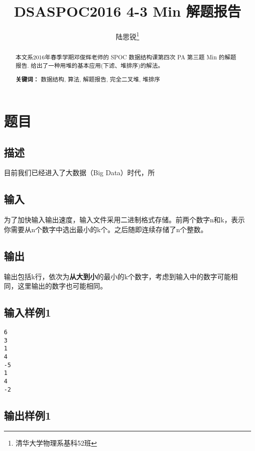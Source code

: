\documentclass[12pt,a4paper]{ctexart}
\title{DSASPOC2016 4-3 Min 解题报告}
\author{陆思锐\thanks{清华大学物理系\quad 基科52班 \quad 2015012206} }
\begin{document}
\maketitle



\begin{abstract}
本文系2016年春季学期邓俊辉老师的 SPOC 数据结构课第四次 PA 第三题 Min
的解题报告. 给出了一种用堆的基本应用(下滤、堆排序)的解法。

\textbf{关键词：} 数据结构, 算法, 解题报告, 完全二叉堆, 堆排序
\end{abstract}



\tableofcontents
\section{题目}\label{ux9898ux76ee}

\subsection{描述}\label{ux63cfux8ff0}

目前我们已经进入了大数据（Big Data）时代，所

\subsection{输入}\label{ux8f93ux5165}

为了加快输入输出速度，输入文件采用二进制格式存储。前两个数字n和k，表示你需要从n个数字中选出最小的k个。之后随即连续存储了n个整数。

\subsection{输出}\label{ux8f93ux51fa}

输出包括k行，依次为\textbf{从大到小}的最小的k个数字，考虑到输入中的数字可能相同，这里输出的数字也可能相同。

\subsection{输入样例1}\label{ux8f93ux5165ux6837ux4f8b1}

\begin{verbatim}
6
3
1
4
-5
1
4
-2
\end{verbatim}

\subsection{输出样例1}\label{ux8f93ux51faux6837ux4f8b1}
\end{document}
